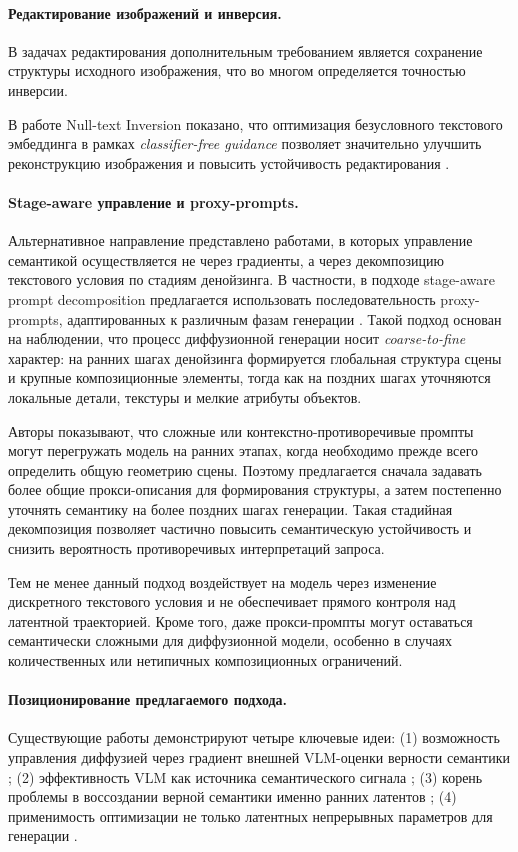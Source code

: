 \paragraph{Редактирование изображений и инверсия.}
В задачах редактирования дополнительным требованием является сохранение структуры исходного изображения, что во многом определяется точностью инверсии.

В работе Null-text Inversion показано, что оптимизация безусловного текстового эмбеддинга в рамках \textit{classifier-free guidance} позволяет значительно улучшить реконструкцию изображения и повысить устойчивость редактирования \cite{mokady2022nulltext}.

\paragraph{Stage-aware управление и proxy-prompts.}
Альтернативное направление представлено работами, в которых управление семантикой осуществляется не через градиенты, а через декомпозицию текстового условия по стадиям денойзинга. В частности, в подходе stage-aware prompt decomposition предлагается использовать последовательность proxy-prompts, адаптированных к различным фазам генерации \cite{huberman2025contextually}. Такой подход основан на наблюдении, что процесс диффузионной генерации носит \emph{coarse-to-fine} характер: на ранних шагах денойзинга формируется глобальная структура сцены и крупные композиционные элементы, тогда как на поздних шагах уточняются локальные детали, текстуры и мелкие атрибуты объектов.

Авторы показывают, что сложные или контекстно-противоречивые промпты могут перегружать модель на ранних этапах, когда необходимо прежде всего определить общую геометрию сцены. Поэтому предлагается сначала задавать более общие прокси-описания для формирования структуры, а затем постепенно уточнять семантику на более поздних шагах генерации. Такая стадийная декомпозиция позволяет частично повысить семантическую устойчивость и снизить вероятность противоречивых интерпретаций запроса.

Тем не менее данный подход воздействует на модель через изменение дискретного текстового условия и не обеспечивает прямого контроля над латентной траекторией. Кроме того, даже прокси-промпты могут оставаться семантически сложными для диффузионной модели, особенно в случаях количественных или нетипичных композиционных ограничений.

\paragraph{Позиционирование предлагаемого подхода.}
Существующие работы демонстрируют четыре ключевые идеи: (1) возможность управления диффузией через градиент внешней VLM-оценки верности семантики \cite{dhariwal2021diffusion,ho2022classifierfree}; (2) эффективность VLM как источника семантического сигнала \cite{miao2024noisediffusion,kumari2025learning}; (3) корень проблемы в воссоздании верной семантики именно ранних латентов \cite{huberman2025contextually}; (4) применимость оптимизации не только латентных непрерывных параметров для генерации \cite{mokady2022nulltext}.

